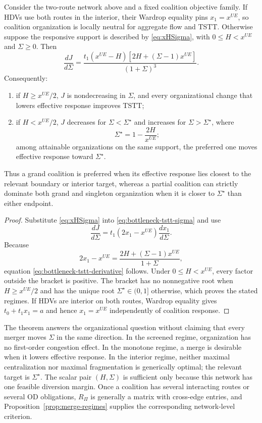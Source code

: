 \begin{theorem}\label{thm:canonical-regimes}
Consider the two-route network above and a fixed coalition objective family.
If HDVs use both routes in the interior, their Wardrop equality pins
$x_1=x^{UE}$, so coalition organization is locally neutral for aggregate flow
and TSTT. Otherwise suppose the responsive support is described by
\eqref{eq:xHSigma}, with $0\leq H<x^{UE}$ and $\Sigma\geq0$. Then
\begin{equation}\label{eq:bottleneck-tstt-derivative}
 \frac{dJ}{d\Sigma}
 =\frac{t_1(x^{UE}-H)
 \left[2H+(\Sigma-1)x^{UE}\right]}{(1+\Sigma)^3}.
\end{equation}
Consequently:
\begin{enumerate}
 \item if $H\geq x^{UE}/2$, $J$ is nondecreasing in $\Sigma$, and every
 organizational change that lowers effective response improves TSTT;
 \item if $H<x^{UE}/2$, $J$ decreases for
 $\Sigma<\Sigma^\star$ and increases for $\Sigma>\Sigma^\star$, where
 \begin{equation}\label{eq:sigma-star}
  \Sigma^\star=1-\frac{2H}{x^{UE}};
 \end{equation}
 among attainable organizations on the same support, the preferred one moves
 effective response toward $\Sigma^\star$.
\end{enumerate}
Thus a grand coalition is preferred when its effective response lies closest
to the relevant boundary or interior target, whereas a partial coalition can
strictly dominate both grand and singleton organization when it is closer to
$\Sigma^\star$ than either endpoint.
\end{theorem}

\begin{proof}
Substitute \eqref{eq:xHSigma} into \eqref{eq:bottleneck-tstt-sigma} and use
\[
 \frac{dJ}{d\Sigma}
 =t_1(2x_1-x^{UE})\frac{dx_1}{d\Sigma}.
\]
Because
\[
 2x_1-x^{UE}
 =\frac{2H+(\Sigma-1)x^{UE}}{1+\Sigma},
\]
equation \eqref{eq:bottleneck-tstt-derivative} follows. Under
$0\leq H<x^{UE}$, every factor outside the bracket is positive. The bracket
has no nonnegative root when $H\geq x^{UE}/2$ and has the unique root
$\Sigma^\star\in(0,1]$ otherwise, which proves the stated regimes. If HDVs are
interior on both routes, Wardrop equality gives
$t_0+t_1x_1=a$ and hence $x_1=x^{UE}$ independently of coalition response.
\end{proof}

The theorem answers the organizational question without claiming that every
merger moves $\Sigma$ in the same direction. In the screened regime,
organization has no first-order congestion effect. In the monotone regime, a
merge is desirable when it lowers effective response. In the interior regime,
neither maximal centralization nor maximal fragmentation is generically
optimal; the relevant target is $\Sigma^\star$. The scalar pair $(H,\Sigma)$
is sufficient only because this network has one feasible diversion margin.
Once a coalition has several interacting routes or several OD obligations,
$R_\Pi$ is generally a matrix with cross-edge entries, and
Proposition~\ref{prop:merge-regimes} supplies the corresponding network-level
criterion.

